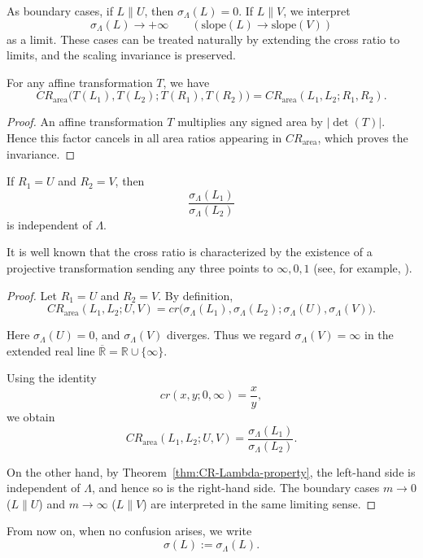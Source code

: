 \documentclass[12pt]{article}
\begin{document}
As boundary cases, if $L\parallel U$, then $\sigma_\Lambda(L)=0$.
If $L\parallel V$, we interpret
\[
\sigma_\Lambda(L)\to +\infty \qquad (\mathrm{slope}(L)\to \mathrm{slope}(V))
\]
as a limit.
These cases can be treated naturally by extending the cross ratio to limits,
and the scaling invariance is preserved.


\begin{theorem}
For any affine transformation $T$, we have
\[
CR_{\mathrm{area}}\bigl(T(L_1),T(L_2);T(R_1),T(R_2)\bigr)
=
CR_{\mathrm{area}}(L_1,L_2;R_1,R_2).
\]
\end{theorem}

\begin{proof}
An affine transformation $T$ multiplies any signed area by $|\det(T)|$.
Hence this factor cancels in all area ratios appearing in $CR_{\mathrm{area}}$,
which proves the invariance.
\end{proof}


\begin{theorem}\label{thm:CR-Lambda-property2}
If $R_1=U$ and $R_2=V$, then
\[
\frac{\sigma_{\Lambda}(L_1)}{\sigma_{\Lambda}(L_2)}
\]
is independent of $\Lambda$.
\end{theorem}

It is well known that the cross ratio is characterized
by the existence of a projective transformation sending any three points
to $\infty,0,1$ (see, for example, \cite{Kobayashi1990}).

\begin{proof}
Let $R_1=U$ and $R_2=V$.
By definition,
\[
CR_{\mathrm{area}}(L_1,L_2;U,V)
=
cr\bigl(\sigma_\Lambda(L_1),\sigma_\Lambda(L_2);
\sigma_\Lambda(U),\sigma_\Lambda(V)\bigr).
\]

Here $\sigma_\Lambda(U)=0$, and $\sigma_\Lambda(V)$ diverges.
Thus we regard $\sigma_\Lambda(V)=\infty$ in the extended real line
$\overline{\mathbb R}=\mathbb R\cup\{\infty\}$.

Using the identity
\[
cr(x,y;0,\infty)=\frac{x}{y},
\]
we obtain
\[
CR_{\mathrm{area}}(L_1,L_2;U,V)
=
\frac{\sigma_\Lambda(L_1)}{\sigma_\Lambda(L_2)}.
\]

On the other hand, by Theorem~\ref{thm:CR-Lambda-property},
the left-hand side is independent of $\Lambda$,
and hence so is the right-hand side.
The boundary cases $m\to0$ ($L\parallel U$) and
$m\to\infty$ ($L\parallel V$) are interpreted in the same limiting sense.
\end{proof}


From now on, when no confusion arises, we write
\[
\sigma(L):=\sigma_{\Lambda}(L).
\]
\end{document}
